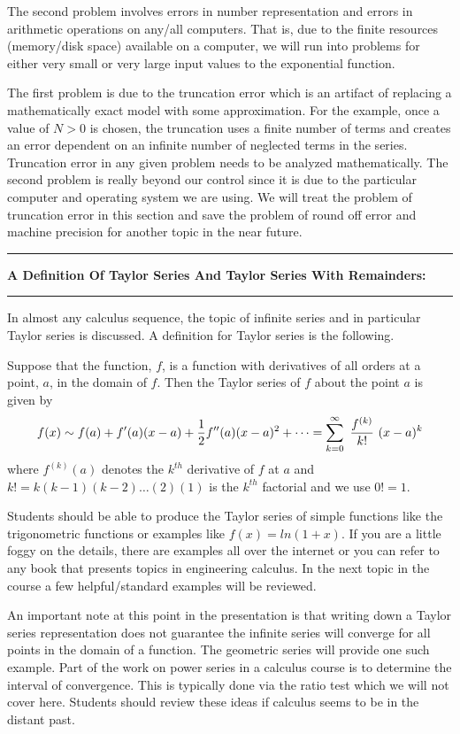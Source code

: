 \documentclass[10pt,fleqn]{article}
\begin{document}
The second problem involves errors in number representation and errors in
arithmetic operations on any/all computers. That is, due to the finite resources
(memory/disk space) available on a computer, we will run into problems for
either very small or very large input values to the exponential function.

The first problem is due to the truncation error which is an artifact of
replacing a mathematically exact model with some approximation. For the example,
once a value of \(N>0\) is chosen, the truncation uses a finite number of terms
and creates an error dependent on an infinite number of neglected terms in the
series. Truncation error in any given problem needs to be analyzed
mathematically. The second problem is really beyond our control since it is due
to the particular computer and operating system we are using. We will treat the
problem of truncation error in this section and save the problem of round off
error and machine precision for another topic in the near future.
\vskip0.1in\hrule\vskip0.1in\noindent
{\bf A Definition Of Taylor Series And Taylor Series With Remainders:} 
\vskip0.1in\hrule\vskip0.1in\noindent
In almost any calculus sequence, the topic of infinite series and in particular
Taylor series is discussed. A definition for Taylor series is the following.
\begin{definition}
  Suppose that the function, \(f\), is a function with derivatives of all
  orders at a point, \(a\), in the domain of \(f\). Then the Taylor series of
  \(f\) about the point \(a\) is given by
  \[
    f(x) \sim f(a) + f'(a) ( x - a ) + {1\over 2} f''(a) ( x - a )^2 + \cdots
          = \sum_{k=0}^\infty\ {{f^{(k)}}\over{k!}}\ ( x - a )^k
  \]
  where \(f^{(k)}(a)\) denotes the \(k^{th}\) derivative of \(f\) at \(a\) and
  \(k!=k(k-1)(k-2)\ldots (2)(1)\) is the \(k^{th}\) factorial and we use
  \(0!=1\).
\end{definition}
Students should be able to produce the Taylor series of simple functions like
the trigonometric functions or examples like \(f(x)=ln(1+x)\). If you are a
little foggy on the details, there are examples all over the internet or you can
refer to any book that presents topics in engineering calculus. In the next
topic in the course a few helpful/standard examples will be reviewed.

An important note at this point in the presentation is that writing down a
Taylor series representation does not guarantee the infinite series will
converge for all points in the domain of a function. The geometric series will
provide one such example. Part of the work on power series in a calculus course
is to determine the interval of convergence. This is typically done via the
ratio test which we will not cover here. Students should review these ideas if
calculus seems to be in the distant past. 
\end{document}
